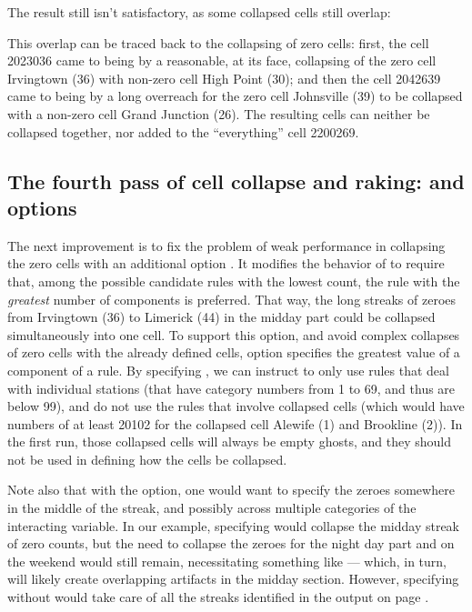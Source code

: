 \begin{stlog}
\nullskip
\end{stlog}

The result still isn't satisfactory, as some collapsed cells still overlap:

\clearpage\newpage

\begin{stlog}
\nullskip
\end{stlog}

This overlap can be traced back to the collapsing of zero cells:
first, the cell 2023036 came to being by a reasonable, at its face, collapsing
of the zero cell Irvingtown (36) with non-zero cell High Point (30);
and then the cell 2042639 came to being by a long overreach for the zero cell
Johnsville (39) to be collapsed with a non-zero cell Grand Junction (26).
The resulting cells can neither be collapsed together, nor added
to the ``everything'' cell 2200269.

\subsection{The fourth pass of cell collapse and raking:  and  options}

The next improvement is to fix the problem of weak performance in
collapsing the zero cells with an additional option .
It modifies the behavior of  to require that,
among the possible candidate rules with the lowest count, the rule with the \textit{greatest} number
of components is preferred. That way, the long streaks of zeroes from Irvingtown (36) to Limerick (44) in
the midday part could be collapsed simultaneously into one cell. To support this option, and avoid complex collapses
of zero cells with the already defined cells, option  specifies the greatest
value of a component of a rule. By specifying , we can instruct 
to only use rules that deal with individual stations (that have category numbers from 1 to 69, and thus
are below 99), and do not use the rules that involve collapsed
cells (which would have numbers of at least 20102 for the collapsed cell Alewife (1) and Brookline (2)).
In the first run, those collapsed cells will always be empty ghosts, and they should not be used
in defining how the cells be collapsed.

Note also that with the  option, one would want to specify the zeroes somewhere in the middle
of the streak, and possibly across multiple categories of the interacting variable. In our example,
specifying  would collapse the midday streak of zero counts, but the need to collapse
the zeroes for the night day part and on the weekend would still remain, necessitating something like
 --- which, in turn, will likely create overlapping artifacts in the midday section.
However, specifying  without  would take care of all the streaks
identified in the output on page \pageref{page:station:daypart}.

